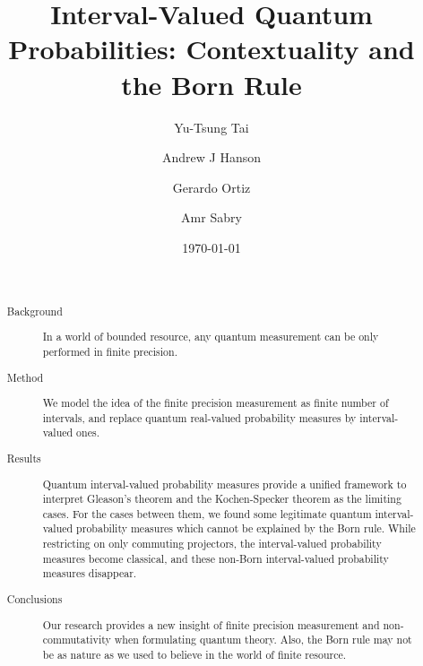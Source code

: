 \documentclass[english,reprint, aps, prl,superscriptaddress, showpacs,
showkeys, longbibliography, amsmath, amssymb]{revtex4-1}
\theoremstyle{plain}
\theoremstyle{definition}
\begin{document}
\title{Interval-Valued Quantum Probabilities: Contextuality and the Born Rule}

\author{Yu-Tsung Tai}

\author{Andrew J Hanson}

\author{Gerardo Ortiz}

\author{Amr Sabry}

\date{\today}

\begin{abstract}~
\begin{description}
\item [{Background}] In a world of bounded resource, any quantum measurement
can be only performed in finite precision.
\item [{Method}] We model the idea of the finite precision measurement
as finite number of intervals, and replace quantum real-valued probability
measures by interval-valued ones.
\item [{Results}] Quantum interval-valued probability measures provide
a unified framework to interpret Gleason's theorem and the Kochen-Specker
theorem as the limiting cases. For the cases between them, we found
some legitimate quantum interval-valued probability measures which
cannot be explained by the Born rule. While restricting on only commuting
projectors, the interval-valued probability measures become classical,
and these non-Born interval-valued probability measures disappear.
\item [{Conclusions}] Our research provides a new insight of finite precision
measurement and non-commutativity when formulating quantum theory.
Also, the Born rule may not be as nature as we used to believe in
the world of finite resource.
\end{description}
\end{abstract}


\end{document}
